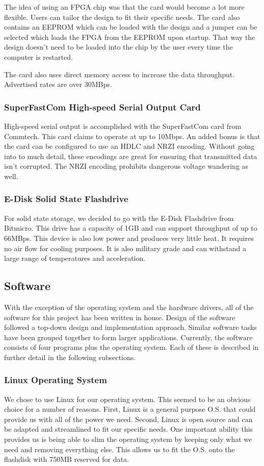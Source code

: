 \documentclass[11pt,titlepage]{article}
\begin{document}
The idea of using an FPGA chip was that the card would become a lot more flexible. Users can tailor the design to fit their specific needs. The card also
contains an EEPROM which can be loaded with the design and a jumper can be selected which loads the FPGA from the EEPROM upon startup. That way the design
doesn't need to be loaded into the chip by the user every time the computer is restarted.

The card also uses direct memory access to increase the data throughput. Advertised rates are over 30MBps. 

\subsubsection{SuperFastCom High-speed Serial Output Card}
High-speed serial output is accomplished with the SuperFastCom card from Commtech. This card claims to operate at up to 10Mbps. An added bonus is that
the card can be configured to use an HDLC and NRZI encoding. Without going into to much detail, these encodings are great for ensuring that transmitted
data isn't corrupted. The NRZI encoding prohibits dangerous voltage wandering as well.

 
\subsubsection{E-Disk Solid State Flashdrive}
For solid state storage, we decided to go with the E-Disk Flashdrive from Bitmicro. This drive has a capacity of 1GB and can support throughput of up to
66MBps. This device is also low power and produces very little heat. It requires no air flow for cooling purposes. It is also military grade and can 
withstand a large range of temperatures and acceleration.


\subsection{Software}

With the exception of the operating system and the hardware drivers, all of the software for this project has been written in house. Design of 
the software followed a top-down design and implementation approach. Similar software tasks have been grouped together to form larger applications.
Currently, the software consists of four programs plus the operating system. Each of these is described in further detail in the following subsections.

\subsubsection{Linux Operating System}
We chose to use Linux for our operating system. This seemed to be an obvious choice for a number of reasons. First, Linux is a general purpose O.S. 
that could provide us with all of the power we need. Second, Linux is open source and can be adapted and streamlined to fit our specific needs. One 
important ability this provides us is being able to slim the operating system by keeping only what we need and removing everything else. This
allows us to fit the O.S. onto the flashdisk with 750MB reserved for data.
\end{document}
